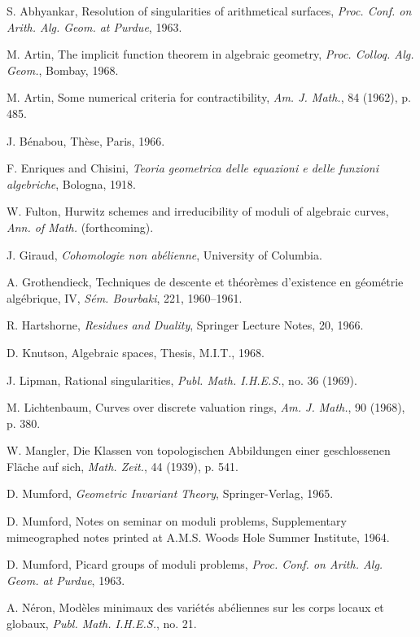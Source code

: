 \documentclass[10pt]{article}
\begin{document}
\begin{description}[leftmargin=2.4em,labelwidth=2.1em,itemsep=0.05em]
\item[{[Ab]}] S. Abhyankar, Resolution of singularities of arithmetical surfaces, \emph{Proc. Conf. on Arith. Alg. Geom. at Purdue}, 1963.
\item[{[A$_1$]}] M. Artin, The implicit function theorem in algebraic geometry, \emph{Proc. Colloq. Alg. Geom.}, Bombay, 1968.
\item[{[A$_2$]}] M. Artin, Some numerical criteria for contractibility, \emph{Am. J. Math.}, 84 (1962), p. 485.
\item[{[B]}] J. Bénabou, Thèse, Paris, 1966.
\item[{[E]}] F. Enriques and Chisini, \emph{Teoria geometrica delle equazioni e delle funzioni algebriche}, Bologna, 1918.
\item[{[F]}] W. Fulton, Hurwitz schemes and irreducibility of moduli of algebraic curves, \emph{Ann. of Math.} (forthcoming).
\item[{[G]}] J. Giraud, \emph{Cohomologie non abélienne}, University of Columbia.
\item[{[Gr]}] A. Grothendieck, Techniques de descente et théorèmes d'existence en géométrie algébrique, IV, \emph{Sém. Bourbaki}, 221, 1960--1961.
\item[{[H]}] R. Hartshorne, \emph{Residues and Duality}, Springer Lecture Notes, 20, 1966.
\item[{[K]}] D. Knutson, Algebraic spaces, Thesis, M.I.T., 1968.
\item[{[Li]}] J. Lipman, Rational singularities, \emph{Publ. Math. I.H.E.S.}, no. 36 (1969).
\item[{[L]}] M. Lichtenbaum, Curves over discrete valuation rings, \emph{Am. J. Math.}, 90 (1968), p. 380.
\item[{[Ma]}] W. Mangler, Die Klassen von topologischen Abbildungen einer geschlossenen Fläche auf sich, \emph{Math. Zeit.}, 44 (1939), p. 541.
\item[{[M$_1$]}] D. Mumford, \emph{Geometric Invariant Theory}, Springer-Verlag, 1965.
\item[{[M$_2$]}] D. Mumford, Notes on seminar on moduli problems, Supplementary mimeographed notes printed at A.M.S. Woods Hole Summer Institute, 1964.
\item[{[M$_3$]}] D. Mumford, Picard groups of moduli problems, \emph{Proc. Conf. on Arith. Alg. Geom. at Purdue}, 1963.
\item[{[N]}] A. Néron, Modèles minimaux des variétés abéliennes sur les corps locaux et globaux, \emph{Publ. Math. I.H.E.S.}, no. 21.

\end{description}
\end{document}
